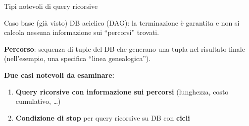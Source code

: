 \documentclass[aspectratio=169]{beamer}
\begin{document}
\begin{frame}{Tipi notevoli di query ricorsive}

\begin{block}{Caso base (già visto)}
DB aciclico (DAG): la terminazione è garantita e non si calcola nessuna informazione sui ``percorsi'' trovati.
\end{block}

\vspace{8pt}
\textbf{Percorso}: sequenza di tuple del DB che generano una tupla nel risultato finale (nell'esempio, una specifica ``linea genealogica'').

\vspace{12pt}
\textbf{Due casi notevoli da esaminare:}

\begin{enumerate}
  \item \textbf{Query ricorsive con informazione sui percorsi} (lunghezza, costo cumulativo, \ldots)
  \item \textbf{Condizione di stop} per query ricorsive su DB con \textbf{cicli}
\end{enumerate}

\end{frame}
\end{document}
